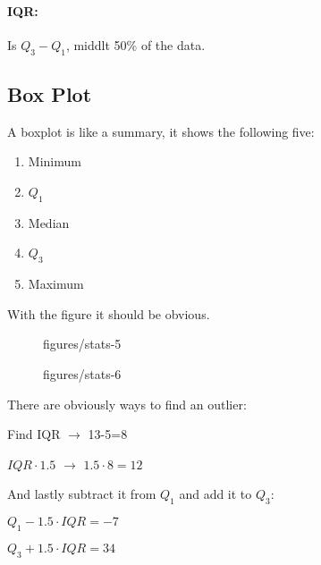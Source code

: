 \documentclass{book}
\begin{document}
\paragraph{IQR:} Is $Q_3 -Q_1$, middlt 50\% of the data.

\subsection{Box Plot}

A boxplot is like a summary, it shows the following five:
\begin{enumerate}
    \item Minimum
    \item $Q_1$
    \item Median
    \item $Q_3$
    \item Maximum
\end{enumerate}
With the figure it should be obvious.

\begin{figure}[ht]
    \centering
    \caption{figures/stats-5}
    \label{fig:stats-5}
\end{figure}

\begin{figure}[ht]
    \centering
    \caption{figures/stats-6}
    \label{fig:stats-6}
\end{figure}

\vspace{50pt}

There are obviously ways to find an outlier:

Find IQR $\to$ 13-5=8

$IQR \cdot 1.5$ $\to $ $1.5\cdot 8=12$

And lastly subtract it from $Q_1$ and add it to $Q_3$:

$Q_1 - 1.5\cdot IQR = -7$

$Q_3 + 1.5\cdot IQR = 34$
\end{document}
